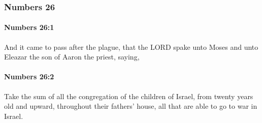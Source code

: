 	\subsubsection{Numbers 26} %
		\label{NUMBERS-26}

		\paragraph{Numbers 26:1} %
			\label{NUMBERS-26-1}

			And it came to pass after the plague, that the LORD spake unto Moses and unto Eleazar the son of Aaron the priest, saying,


		\paragraph{Numbers 26:2} %
			\label{NUMBERS-26-2}

			Take the sum of all the congregation of the children of Israel, from twenty years old and upward, throughout their fathers’ house, all that are able to go to war in Israel.

